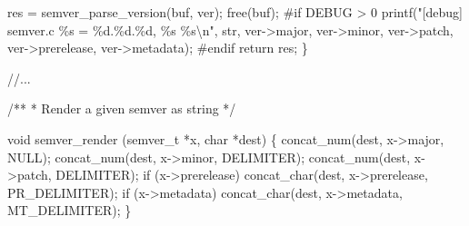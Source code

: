 \documentclass[
  a4paper,
]{scrreprt}
\newenvironment{Shaded}{\begin{snugshade}}{\end{snugshade}}
\newcommand{\CommentTok}[1]{\textcolor[rgb]{0.41,0.41,0.41}{#1}}
\newcommand{\ControlFlowTok}[1]{\textcolor[rgb]{0.85,0.12,0.09}{#1}}
\newcommand{\DataTypeTok}[1]{\textcolor[rgb]{0.47,0.16,0.63}{#1}}
\newcommand{\NormalTok}[1]{\textcolor[rgb]{0.33,0.33,0.33}{#1}}
\newcommand{\OperatorTok}[1]{\textcolor[rgb]{0.00,0.46,0.62}{#1}}
\newcommand{\PreprocessorTok}[1]{\textcolor[rgb]{0.47,0.16,0.63}{#1}}
\newcommand{\SpecialCharTok}[1]{\textcolor[rgb]{0.00,0.46,0.62}{#1}}
\newcommand{\StringTok}[1]{\textcolor[rgb]{0.00,0.50,0.00}{#1}}
\theoremstyle{definition}
\theoremstyle{remark}
\begin{document}
\begin{Shaded}
\begin{Highlighting}[numbers=left,,]
\NormalTok{  res }\OperatorTok{=}\NormalTok{ semver\_parse\_version}\OperatorTok{(}\NormalTok{buf}\OperatorTok{,}\NormalTok{ ver}\OperatorTok{);}
\NormalTok{  free}\OperatorTok{(}\NormalTok{buf}\OperatorTok{);}
\PreprocessorTok{\#if DEBUG \textgreater{} 0}
\NormalTok{  printf}\OperatorTok{(}\StringTok{"[debug] semver.c }\SpecialCharTok{\%s}\StringTok{ = }\SpecialCharTok{\%d}\StringTok{.}\SpecialCharTok{\%d}\StringTok{.}\SpecialCharTok{\%d}\StringTok{, }\SpecialCharTok{\%s}\StringTok{ }\SpecialCharTok{\%s\textbackslash{}n}\StringTok{"}\OperatorTok{,}\NormalTok{ str}\OperatorTok{,}\NormalTok{ ver}\OperatorTok{{-}\textgreater{}}\NormalTok{major}\OperatorTok{,}\NormalTok{ ver}\OperatorTok{{-}\textgreater{}}\NormalTok{minor}\OperatorTok{,}\NormalTok{ ver}\OperatorTok{{-}\textgreater{}}\NormalTok{patch}\OperatorTok{,}\NormalTok{ ver}\OperatorTok{{-}\textgreater{}}\NormalTok{prerelease}\OperatorTok{,}\NormalTok{ ver}\OperatorTok{{-}\textgreater{}}\NormalTok{metadata}\OperatorTok{);}
\PreprocessorTok{\#endif}
  \ControlFlowTok{return}\NormalTok{ res}\OperatorTok{;}
\OperatorTok{\}}

\CommentTok{//...}

\CommentTok{/**}
\CommentTok{ * Render a given semver as string}
\CommentTok{ */}

\DataTypeTok{void}
\NormalTok{semver\_render }\OperatorTok{(}\NormalTok{semver\_t }\OperatorTok{*}\NormalTok{x}\OperatorTok{,} \DataTypeTok{char} \OperatorTok{*}\NormalTok{dest}\OperatorTok{)} \OperatorTok{\{}
\NormalTok{  concat\_num}\OperatorTok{(}\NormalTok{dest}\OperatorTok{,}\NormalTok{ x}\OperatorTok{{-}\textgreater{}}\NormalTok{major}\OperatorTok{,}\NormalTok{ NULL}\OperatorTok{);}
\NormalTok{  concat\_num}\OperatorTok{(}\NormalTok{dest}\OperatorTok{,}\NormalTok{ x}\OperatorTok{{-}\textgreater{}}\NormalTok{minor}\OperatorTok{,}\NormalTok{ DELIMITER}\OperatorTok{);}
\NormalTok{  concat\_num}\OperatorTok{(}\NormalTok{dest}\OperatorTok{,}\NormalTok{ x}\OperatorTok{{-}\textgreater{}}\NormalTok{patch}\OperatorTok{,}\NormalTok{ DELIMITER}\OperatorTok{);}
  \ControlFlowTok{if} \OperatorTok{(}\NormalTok{x}\OperatorTok{{-}\textgreater{}}\NormalTok{prerelease}\OperatorTok{)}\NormalTok{ concat\_char}\OperatorTok{(}\NormalTok{dest}\OperatorTok{,}\NormalTok{ x}\OperatorTok{{-}\textgreater{}}\NormalTok{prerelease}\OperatorTok{,}\NormalTok{ PR\_DELIMITER}\OperatorTok{);}
  \ControlFlowTok{if} \OperatorTok{(}\NormalTok{x}\OperatorTok{{-}\textgreater{}}\NormalTok{metadata}\OperatorTok{)}\NormalTok{ concat\_char}\OperatorTok{(}\NormalTok{dest}\OperatorTok{,}\NormalTok{ x}\OperatorTok{{-}\textgreater{}}\NormalTok{metadata}\OperatorTok{,}\NormalTok{ MT\_DELIMITER}\OperatorTok{);}
\OperatorTok{\}}
\end{Highlighting}
\end{Shaded}
\end{document}
